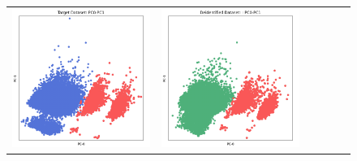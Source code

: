 \begin{figure}[p!]
\begin{tabular}{@{} M{0.166\textwidth} M{0.166\textwidth} | M{0.166\textwidth} M{0.166\textwidth} | M{0.166\textwidth} M{0.166\textwidth} @{}}
       \includegraphics[width=\linewidth]{z_SynDiffix.orig.png} &
       \includegraphics[width=\linewidth]{z_SynDiffix.syn.png} &

\end{tabular}
\end{figure}
